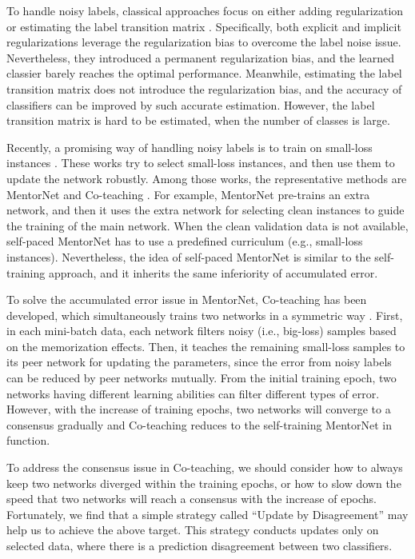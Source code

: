 \documentclass{article}
\begin{document}
To handle noisy labels, classical approaches focus on either adding regularization \cite{miyato2016virtual} or estimating the label transition matrix \cite{patrini2017making}. Specifically, both explicit and implicit regularizations leverage the regularization bias to overcome the label noise issue. Nevertheless, they introduced a permanent regularization bias, and the learned classier barely reaches the optimal performance. Meanwhile, estimating the label transition matrix does not introduce the regularization bias, and the accuracy of classifiers can be improved by such accurate estimation. However, the label transition matrix is hard to be estimated, when the number of classes is large.

Recently, a promising way of handling noisy labels is to train on small-loss instances \cite{jiang2018mentornet,ren2018learning}. These works try to select small-loss instances, and then use them to update the network robustly. Among those works, the representative methods are MentorNet \cite{jiang2018mentornet} and Co-teaching \cite{han2018coteaching}. For example, MentorNet pre-trains an extra network, and then it uses the extra network for selecting clean instances to guide the training of the main network. When the clean validation data is not available, self-paced MentorNet has to use a predefined curriculum (e.g., small-loss instances). Nevertheless, the idea of self-paced MentorNet is similar to the self-training approach, and it inherits the same inferiority of accumulated error.

To solve the accumulated error issue in MentorNet, Co-teaching has been developed, which simultaneously trains two networks in a symmetric way \cite{han2018coteaching}. First, in each mini-batch data, each network filters noisy (i.e., big-loss) samples based on the memorization effects. Then, it teaches the remaining small-loss samples to its peer network for updating the parameters, since the error from noisy labels can be reduced by peer networks mutually. From the initial training epoch, two networks having different learning abilities can filter different types of error. However, with the increase of training epochs, two networks will converge to a consensus gradually and Co-teaching reduces to the self-training MentorNet in function.

To address the consensus issue in Co-teaching, we should consider how to always keep two networks diverged within the training epochs, or how to slow down the speed that two networks will reach a consensus with the increase of epochs. Fortunately, we find that a simple strategy called ``Update by Disagreement'' \cite{malach2017decoupling} may help us to achieve the above target. This strategy conducts updates only on selected data, where there is a prediction disagreement between two classifiers.
\end{document}
